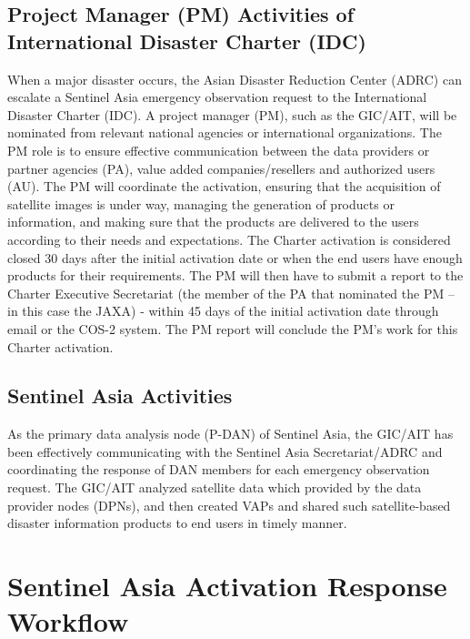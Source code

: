 \documentclass[]{book}
\theoremstyle{definition}
\theoremstyle{definition}
\theoremstyle{definition}
\theoremstyle{remark}
\begin{document}
\section{Project Manager (PM) Activities of International Disaster
Charter
(IDC)}\label{project-manager-pm-activities-of-international-disaster-charter-idc}

When a major disaster occurs, the Asian Disaster Reduction Center (ADRC)
can escalate a Sentinel Asia emergency observation request to the
International Disaster Charter (IDC). A project manager (PM), such as
the GIC/AIT, will be nominated from relevant national agencies or
international organizations. The PM role is to ensure effective
communication between the data providers or partner agencies (PA), value
added companies/resellers and authorized users (AU). The PM will
coordinate the activation, ensuring that the acquisition of satellite
images is under way, managing the generation of products or information,
and making sure that the products are delivered to the users according
to their needs and expectations. The Charter activation is considered
closed 30 days after the initial activation date or when the end users
have enough products for their requirements. The PM will then have to
submit a report to the Charter Executive Secretariat (the member of the
PA that nominated the PM -- in this case the JAXA) - within 45 days of
the initial activation date through email or the COS-2 system. The PM
report will conclude the PM's work for this Charter activation.

\section{Sentinel Asia Activities}\label{sentinel-asia-activities}

As the primary data analysis node (P-DAN) of Sentinel Asia, the GIC/AIT
has been effectively communicating with the Sentinel Asia
Secretariat/ADRC and coordinating the response of DAN members for each
emergency observation request. The GIC/AIT analyzed satellite data which
provided by the data provider nodes (DPNs), and then created VAPs and
shared such satellite-based disaster information products to end users
in timely manner.

\chapter{Sentinel Asia Activation Response
Workflow}\label{sentinel-asia-activation-response-workflow}
\end{document}
